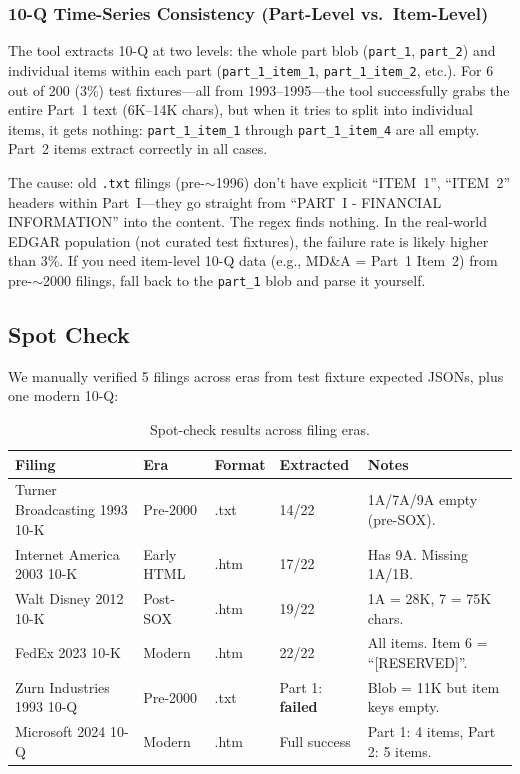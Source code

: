 \documentclass[11pt]{article}
\begin{document}
\subsubsection{10-Q Time-Series Consistency (Part-Level vs.\ Item-Level)}

The tool extracts 10-Q at two levels: the whole part blob (\texttt{part\_1},
\texttt{part\_2}) and individual items within each part
(\texttt{part\_1\_item\_1}, \texttt{part\_1\_item\_2}, etc.). For 6 out of 200
(3\%) test fixtures---all from 1993--1995---the tool successfully grabs the
entire Part~1 text (6K--14K chars), but when it tries to split into individual
items, it gets nothing: \texttt{part\_1\_item\_1} through
\texttt{part\_1\_item\_4} are all empty. Part~2 items extract correctly in all
cases.

The cause: old \texttt{.txt} filings (pre-$\sim$1996) don't have explicit
``ITEM~1'', ``ITEM~2'' headers within Part~I---they go straight from ``PART~I -
FINANCIAL INFORMATION'' into the content. The regex finds nothing. In the
real-world EDGAR population (not curated test fixtures), the failure rate is
likely higher than 3\%. If you need item-level 10-Q data (e.g., MD\&A = Part~1
Item~2) from pre-$\sim$2000 filings, fall back to the \texttt{part\_1} blob and
parse it yourself.

\subsection{Spot Check}

We manually verified 5 filings across eras from test fixture expected JSONs,
plus one modern 10-Q:

\begin{table}[h]
\centering
\small
\begin{tabular}{lllll}
\toprule
Filing & Era & Format & Extracted & Notes \\
\midrule
Turner Broadcasting 1993 10-K & Pre-2000 & .txt & 14/22 &
  1A/7A/9A empty (pre-SOX). \\
Internet America 2003 10-K & Early HTML & .htm & 17/22 &
  Has 9A. Missing 1A/1B. \\
Walt Disney 2012 10-K & Post-SOX & .htm & 19/22 &
  1A = 28K, 7 = 75K chars. \\
FedEx 2023 10-K & Modern & .htm & 22/22 &
  All items. Item 6 = ``[RESERVED]''. \\
Zurn Industries 1993 10-Q & Pre-2000 & .txt & Part 1: \textbf{failed} &
  Blob = 11K but item keys empty. \\
Microsoft 2024 10-Q & Modern & .htm & Full success &
  Part 1: 4 items, Part 2: 5 items. \\
\bottomrule
\end{tabular}
\caption{Spot-check results across filing eras.}
\end{table}
\end{document}
